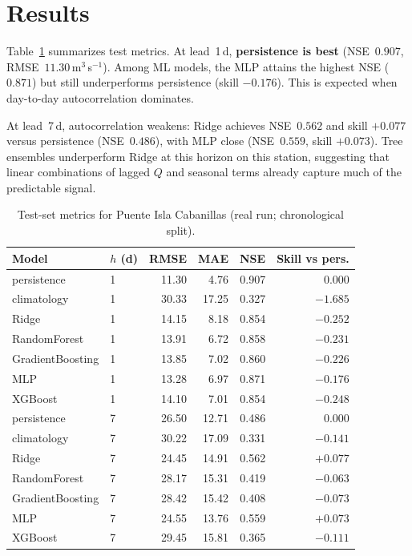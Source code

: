 \documentclass[graybox]{svmult}
\begin{document}
\section{Results}
\label{sec:results}
Table~\ref{tab:metrics} summarizes test metrics. At lead~1\,d, \textbf{persistence is best} (NSE~$0.907$, RMSE~$11.30$\,m$^3$\,s$^{-1}$). Among ML models, the MLP attains the highest NSE ($0.871$) but still underperforms persistence (skill $-0.176$). This is expected when day-to-day autocorrelation dominates.

At lead~7\,d, autocorrelation weakens: Ridge achieves NSE~$0.562$ and skill $+0.077$ versus persistence (NSE~$0.486$), with MLP close (NSE~$0.559$, skill $+0.073$). Tree ensembles underperform Ridge at this horizon on this station, suggesting that linear combinations of lagged $Q$ and seasonal terms already capture much of the predictable signal.

\begin{table}[htbp]
\centering
\caption{Test-set metrics for Puente Isla Cabanillas (real run; chronological split).}
\label{tab:metrics}
\begin{tabular}{llrrrr}
\toprule
Model & $h$ (d) & RMSE & MAE & NSE & Skill vs pers. \\
\midrule
persistence & 1 & 11.30 & 4.76 & 0.907 & 0.000 \\
climatology & 1 & 30.33 & 17.25 & 0.327 & $-1.685$ \\
Ridge & 1 & 14.15 & 8.18 & 0.854 & $-0.252$ \\
RandomForest & 1 & 13.91 & 6.72 & 0.858 & $-0.231$ \\
GradientBoosting & 1 & 13.85 & 7.02 & 0.860 & $-0.226$ \\
MLP & 1 & 13.28 & 6.97 & 0.871 & $-0.176$ \\
XGBoost & 1 & 14.10 & 7.01 & 0.854 & $-0.248$ \\
\midrule
persistence & 7 & 26.50 & 12.71 & 0.486 & 0.000 \\
climatology & 7 & 30.22 & 17.09 & 0.331 & $-0.141$ \\
Ridge & 7 & 24.45 & 14.91 & 0.562 & $+0.077$ \\
RandomForest & 7 & 28.17 & 15.31 & 0.419 & $-0.063$ \\
GradientBoosting & 7 & 28.42 & 15.42 & 0.408 & $-0.073$ \\
MLP & 7 & 24.55 & 13.76 & 0.559 & $+0.073$ \\
XGBoost & 7 & 29.45 & 15.81 & 0.365 & $-0.111$ \\
\bottomrule
\end{tabular}
\end{table}
\end{document}
